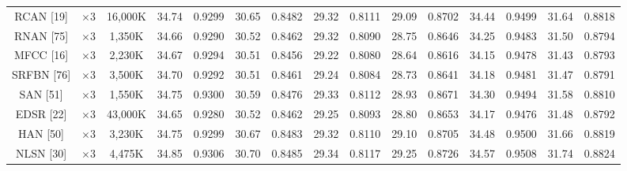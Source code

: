 \documentclass{ieeeaccess}
\begin{document}
\begin{table}
\begin{tabular}{|c|c|c|cc|cc|cc|cc|cc|cc|}
RCAN [19]& $\times3$ &16,000K& \multicolumn{1}{c|}{34.74} & 0.9299 & \multicolumn{1}{c|}{30.65} & 0.8482 &\multicolumn{1}{c|}{29.32} & 0.8111& \multicolumn{1}{c|}{29.09} & 0.8702 & \multicolumn{1}{c|}{34.44} & 0.9499
&\multicolumn{1}{c|}{31.64} & 0.8818\\

RNAN [75]& $\times3$ &1,350K& \multicolumn{1}{c|}{34.66} & 0.9290 & \multicolumn{1}{c|}{30.52} & 0.8462 &\multicolumn{1}{c|}{29.32} & 0.8090& \multicolumn{1}{c|}{28.75} & 0.8646 & \multicolumn{1}{c|}{34.25} & 0.9483
&\multicolumn{1}{c|}{31.50} & 0.8794\\

MFCC [16]& $\times 3$&2,230K& \multicolumn{1}{c|}{34.67} & 0.9294 & \multicolumn{1}{c|}{30.51} &0.8456 &\multicolumn{1}{c|}{29.22} & 0.8080& \multicolumn{1}{c|}{28.64} & 0.8616 & \multicolumn{1}{c|}{34.15} & 0.9478
&\multicolumn{1}{c|}{31.43} & 0.8793\\

SRFBN [76]&$\times3$ &3,500K& \multicolumn{1}{c|}{34.70} & 0.9292 & \multicolumn{1}{c|}{30.51} &0.8461 &\multicolumn{1}{c|}{29.24} & 0.8084& \multicolumn{1}{c|}{28.73} & 0.8641 & \multicolumn{1}{c|}{34.18} & 0.9481
&\multicolumn{1}{c|}{31.47} & 0.8791\\

SAN [51]& $\times3$ &1,550K& \multicolumn{1}{c|}{34.75} &  0.9300 & \multicolumn{1}{c|}{30.59} & 0.8476 &\multicolumn{1}{c|}{29.33} & 0.8112 & \multicolumn{1}{c|}{28.93} & 0.8671 & \multicolumn{1}{c|}{34.30} & 0.9494
&\multicolumn{1}{c|}{31.58} &  0.8810\\

EDSR [22]& $\times3$&43,000K& \multicolumn{1}{c|}{34.65} & 0.9280 & \multicolumn{1}{c|}{30.52} & 0.8462 &\multicolumn{1}{c|}{29.25} & 0.8093& \multicolumn{1}{c|}{28.80} & 0.8653 & \multicolumn{1}{c|}{34.17} & 0.9476
&\multicolumn{1}{c|}{31.48} &0.8792\\

HAN [50] & $\times3$&3,230K& \multicolumn{1}{c|}{34.75} & 0.9299 & \multicolumn{1}{c|}{30.67} & 0.8483 &\multicolumn{1}{c|}{29.32} & 0.8110 & \multicolumn{1}{c|}{29.10} & 0.8705 & \multicolumn{1}{c|}{34.48} & 0.9500
&\multicolumn{1}{c|}{31.66} &0.8819\\

NLSN [30] & $\times3$ &4,475K& \multicolumn{1}{c|}{34.85} & 0.9306& \multicolumn{1}{c|}{30.70} &0.8485 &\multicolumn{1}{c|}{29.34} & 0.8117& \multicolumn{1}{c|}{29.25} & 0.8726& \multicolumn{1}{c|}{34.57} & 0.9508
&\multicolumn{1}{c|}{31.74} &0.8824\\


\end{tabular}
\end{table}
\end{document}

